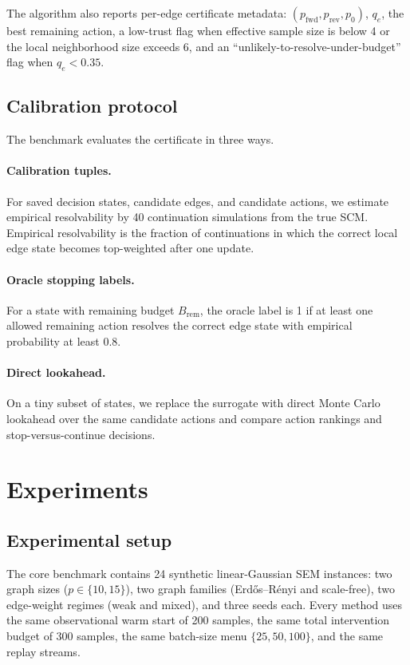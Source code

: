 \documentclass{article}
\newcommand{\qe}{q_e}
\begin{document}
The algorithm also reports per-edge certificate metadata: $(p_{\mathrm{fwd}},p_{\mathrm{rev}},p_0)$, $\qe$, the best remaining action, a low-trust flag when effective sample size is below 4 or the local neighborhood size exceeds 6, and an ``unlikely-to-resolve-under-budget'' flag when $\qe<0.35$.

\subsection{Calibration protocol}

The benchmark evaluates the certificate in three ways.

\paragraph{Calibration tuples.}
For saved decision states, candidate edges, and candidate actions, we estimate empirical resolvability by 40 continuation simulations from the true SCM. Empirical resolvability is the fraction of continuations in which the correct local edge state becomes top-weighted after one update.

\paragraph{Oracle stopping labels.}
For a state with remaining budget $B_{\mathrm{rem}}$, the oracle label is 1 if at least one allowed remaining action resolves the correct edge state with empirical probability at least 0.8.

\paragraph{Direct lookahead.}
On a tiny subset of states, we replace the surrogate with direct Monte Carlo lookahead over the same candidate actions and compare action rankings and stop-versus-continue decisions.

\section{Experiments}
\label{sec:experiments}

\subsection{Experimental setup}

The core benchmark contains 24 synthetic linear-Gaussian SEM instances: two graph sizes ($p\in\{10,15\}$), two graph families (Erd\H{o}s--R\'enyi and scale-free), two edge-weight regimes (weak and mixed), and three seeds each. Every method uses the same observational warm start of 200 samples, the same total intervention budget of 300 samples, the same batch-size menu $\{25,50,100\}$, and the same replay streams.
\end{document}
